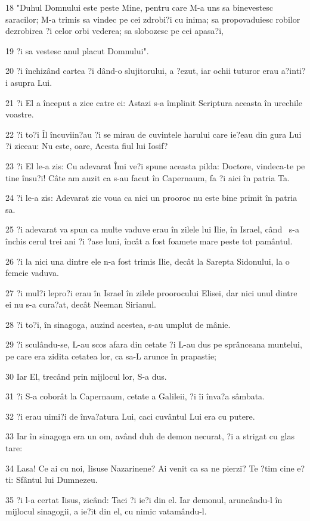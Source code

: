 \par 18 "Duhul Domnului este peste Mine, pentru care M-a uns sa binevestesc saracilor; M-a trimis sa vindec pe cei zdrobi?i cu inima; sa propovaduiesc robilor dezrobirea ?i celor orbi vederea; sa slobozesc pe cei apasa?i,
\par 19 ?i sa vestesc anul placut Domnului".
\par 20 ?i închizând cartea ?i dând-o slujitorului, a ?ezut, iar ochii tuturor erau a?inti?i asupra Lui.
\par 21 ?i El a început a zice catre ei: Astazi s-a împlinit Scriptura aceasta în urechile voastre.
\par 22 ?i to?i Îl încuviin?au ?i se mirau de cuvintele harului care ie?eau din gura Lui ?i ziceau: Nu este, oare, Acesta fiul lui Iosif?
\par 23 ?i El le-a zis: Cu adevarat Îmi ve?i spune aceasta pilda: Doctore, vindeca-te pe tine însu?i! Câte am auzit ca s-au facut în Capernaum, fa ?i aici în patria Ta.
\par 24 ?i le-a zis: Adevarat zic voua ca nici un prooroc nu este bine primit în patria sa.
\par 25 ?i adevarat va spun ca multe vaduve erau în zilele lui Ilie, în Israel, când  s-a închis cerul trei ani ?i ?ase luni, încât a fost foamete mare peste tot pamântul.
\par 26 ?i la nici una dintre ele n-a fost trimis Ilie, decât la Sarepta Sidonului, la o femeie vaduva.
\par 27 ?i mul?i lepro?i erau în Israel în zilele proorocului Elisei, dar nici unul dintre ei nu s-a cura?at, decât Neeman Sirianul.
\par 28 ?i to?i, în sinagoga, auzind acestea, s-au umplut de mânie.
\par 29 ?i sculându-se, L-au scos afara din cetate ?i L-au dus pe sprânceana muntelui, pe care era zidita cetatea lor, ca sa-L arunce în prapastie;
\par 30 Iar El, trecând prin mijlocul lor, S-a dus.
\par 31 ?i S-a coborât la Capernaum, cetate a Galileii, ?i îi înva?a sâmbata.
\par 32 ?i erau uimi?i de înva?atura Lui, caci cuvântul Lui era cu putere.
\par 33 Iar în sinagoga era un om, având duh de demon necurat, ?i a strigat cu glas tare:
\par 34 Lasa! Ce ai cu noi, Iisuse Nazarinene? Ai venit ca sa ne pierzi? Te ?tim cine e?ti: Sfântul lui Dumnezeu.
\par 35 ?i l-a certat Iisus, zicând: Taci ?i ie?i din el. Iar demonul, aruncându-l în mijlocul sinagogii, a ie?it din el, cu nimic vatamându-l.
